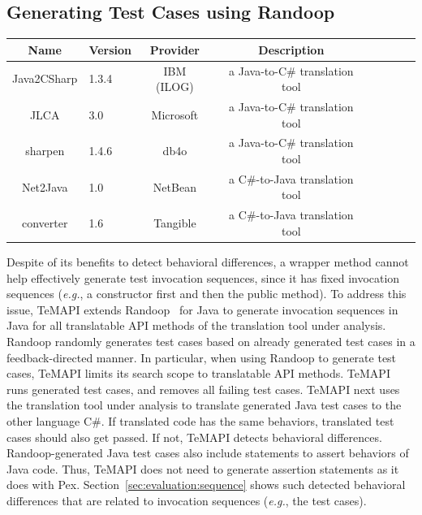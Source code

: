 \subsection{Generating Test Cases using Randoop}

\label{sec:approach:sequence}
\begin{table}[t]
\centering
\begin{SmallOut}
\begin {tabular} {|c|l|c|c|c|c|c|c|}
\hline
\textbf{Name}& \textbf{Version}& \textbf{Provider} &\textbf{Description}\\
\hline
Java2CSharp  &  1.3.4 & IBM (ILOG) & a Java-to-C\# translation tool\\
\hline
JLCA         &  3.0   & Microsoft  & a Java-to-C\# translation tool\\
\hline
sharpen      &  1.4.6 & db4o       & a Java-to-C\# translation tool \\
\hline
Net2Java     &  1.0   & NetBean    & a C\#-to-Java translation tool\\
\hline
converter    &  1.6   & Tangible   & a C\#-to-Java translation tool\\
\hline
\end{tabular}%
 \label{table:subjects}
\end{SmallOut}\vspace*{-4ex}
\end{table}

Despite of its benefits to detect behavioral differences, a wrapper method cannot help effectively generate test invocation sequences, since it has fixed invocation sequences (\emph{e.g.}, a constructor first and then the public method). To address this issue, TeMAPI extends Randoop~\cite{pacheco2007feedback} for Java to generate invocation sequences in Java for all translatable API methods of the translation tool under analysis. Randoop randomly generates test cases based on already generated test cases in a feedback-directed manner. In particular, when using Randoop to generate test cases, TeMAPI limits its search scope to translatable API methods. TeMAPI runs generated test cases, and removes all failing test cases. TeMAPI next uses the translation tool under analysis to translate generated Java test cases to the other language C\#. If translated code has the same behaviors, translated test cases should also get passed. If not, TeMAPI detects behavioral differences. Randoop-generated Java test cases also include  statements to assert behaviors of Java code. Thus, TeMAPI does not need to generate assertion statements as it does with Pex. Section~\ref{sec:evaluation:sequence} shows such detected behavioral differences that are related to invocation sequences (\emph{e.g.}, the  test cases).


